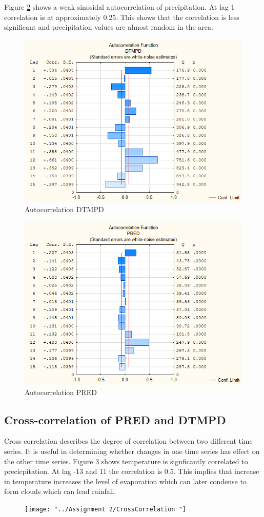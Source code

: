 \documentclass[12pt,a4paper]{article}
\begin{document}
\noindent Figure \ref{fig:autocorrelation-pred} shows a weak sinosidal autocorrelation of precipitation. At lag 1 correlation is at approximately 0.25. This shows that the correlation is less significant and precipitation values are almost random in the area.
\begin{figure}[h]
	\centering
	\includegraphics[width=0.7\linewidth, height=0.2\textheight]{"../Assignment 2/Autocorrelation DTMPD"}
	\caption{Autocorrelation DTMPD}
	\label{fig:autocorrelation-dtmpd}
\end{figure}

\begin{figure}[h]
	\centering
	\includegraphics[width=0.7\linewidth, height=0.3\textheight]{"../Assignment 2/Autocorrelation PRED"}
	\caption{Autocorrelation PRED}
	\label{fig:autocorrelation-pred}
\end{figure}

\newpage

\subsection{Cross-correlation of PRED and DTMPD}
Cross-correlation describes the degree of correlation between two different time series. It is useful in determining whether changes in one time series has effect on the other time series. Figure \ref{fig:crosscorrelation} shows temperature is signficantly correlated to precicpitation. At lag -13 and 11 the correlation is 0.5. This implies that increase in temperature increases the level of evaporation which can later condense to form clouds which can lead rainfall.
\begin{figure}[h]
	\centering
	\texttt{[image: "../Assignment 2/CrossCorrelation "]}
	\caption{}
	\label{fig:crosscorrelation}
\end{figure}
\end{document}
